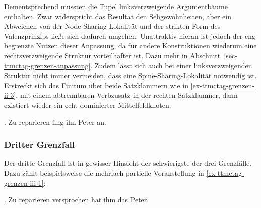 Dementsprechend müssten die Tupel linksverzweigende Argumentbäume enthalten. Zwar widerspricht das Resultat den Sehgewohnheiten, aber ein Abweichen von der Node-Sharing-Lokalität und der strikten Form des Valenzprinzips lie\ss e sich dadurch umgehen. Unattraktiv hieran ist jedoch der eng begrenzte Nutzen dieser Anpassung, da für andere Konstruktionen wiederum eine rechtsverzweigende Struktur vorteilhafter ist. Dazu mehr in Abschnitt~\ref{sec-ttmctag-grenzen-anpassung}. Zudem lässt sich auch bei einer linksverzweigenden Struktur nicht immer vermeiden, dass eine Spine-Sharing-Lokalität notwendig ist. Erstreckt sich das Finitum über beide Satzklammern wie in \ref{ex-ttmctag-grenzen-ii-3}, mit einem abtrennbaren Verbzusatz in der rechten Satzklammer, dann existiert wieder ein echt-dominierter Mittelfeldknoten:   

\ex. Zu reparieren fing ihn Peter an. \label{ex-ttmctag-grenzen-ii-3}  


\subsubsection*{Dritter Grenzfall}

Der dritte Grenzfall ist in gewisser Hinsicht der schwierigste der drei Grenzfälle. Dazu zählt beispielsweise die mehrfach partielle Voranstellung in \ref{ex-ttmctag-grenzen-iii-1}: 

\ex. Zu reparieren versprochen hat ihm das Peter. \label{ex-ttmctag-grenzen-iii-1}

